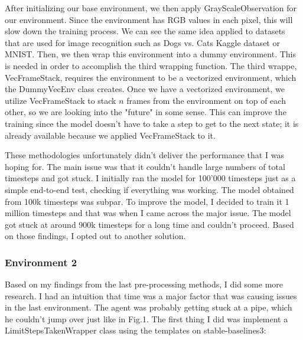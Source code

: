 \documentclass{article}
\numberwithin{equation}{section}
\numberwithin{equation}{section}
\begin{document}
After initializing our base environment, we then apply GrayScaleObservation for our environment. Since the environment has RGB values in each pixel, this will slow down the training process. We can see the same idea applied to datasets that are used for image recognition such as Dogs vs. Cats Kaggle dataset or MNIST. Then, we then wrap this environment into a dummy environment. This is needed in order to accomplish the third wrapping function. The third wrappe, VecFrameStack, requires the environment to be a vectorized environment, which the DummyVecEnv class creates. Once we have a vectorized environment, we utilize VecFrameStack to stack $n$ frames from the environment on top of each other, so we are looking into the "future" in some sense. This can improve the training since the model doesn't have to take a step to get to the next state; it is already available because we applied VecFrameStack to it.

These methodologies unfortunately didn't deliver the performance that I was hoping for. The main issue was that it couldn't handle large numbers of total timesteps and got stuck. I initially ran the model for 100'000 timesteps just as a simple end-to-end test, checking if everything was working. The model obtained from 100k timesteps was subpar. To improve the model, I decided to train it 1 million timesteps and that was when I came across the major issue. The model got stuck at around 900k timesteps for a long time and couldn't proceed. Based on those findings, I opted out to another solution.

\subsubsection*{Environment 2}

Based on my findings from the last pre-processing methods, I did some more research. I had an intuition that time was a major factor that was causing issues in the last environment. The agent was probably getting stuck at a pipe, which he couldn't jump over just like in Fig.1. The first thing I did was implement a LimitStepsTakenWrapper class using the templates on stable-baselines3:
\end{document}
